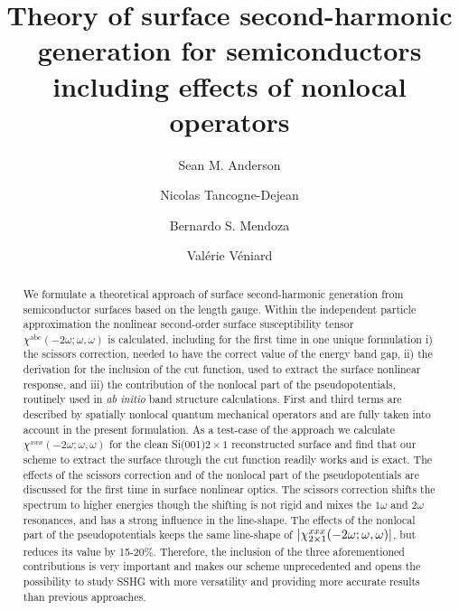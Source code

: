 \documentclass[floatfix,prb,aps,superscriptaddress,11pt,preprint,letterpaper]{revtex4}
\begin{document}
\title{Theory of surface second-harmonic generation for semiconductors
including effects of nonlocal operators}
\author{Sean M. Anderson}
\author{Nicolas Tancogne-Dejean}
\author{Bernardo S. Mendoza}
\author{Val\'erie V\'eniard}

\begin{abstract}
We formulate a theoretical approach of surface second-harmonic generation 
from semiconductor surfaces based on the length gauge. 
Within the independent particle approximation 
the nonlinear second-order surface susceptibility tensor
$\chi^{\mathrm{a}\mathrm{b}\mathrm{c}}(-2\omega;\omega,\omega)$   
is calculated, including for the first time in one unique formulation
i) the scissors correction, needed to have the correct value of the
energy band gap,
ii) the derivation for the inclusion of the cut function, 
used to extract the surface nonlinear response,
and iii) the contribution of the nonlocal part of the 
pseudopotentials, routinely  used in \textit{ab initio} band structure calculations. 
First and third terms are described by spatially nonlocal quantum
mechanical operators and are fully taken into account in the present formulation. 
As a test-case of the approach we calculate 
$\chi^{xxx}(-2\omega;\omega,\omega)$ for the clean Si(001)$2\times 1$
reconstructed surface and find that our scheme to extract the surface
through the cut function
readily works and is exact. The effects of the scissors correction and
of the nonlocal part of the pseudopotentials are discussed for the
first time in surface nonlinear optics. 
The scissors correction shifts the spectrum to 
higher energies though the shifting is not rigid and mixes the 
$1\omega$ and $2\omega$ resonances, 
and has a strong influence in the line-shape. 
The 
effects of the nonlocal part of the pseudopotentials 
keeps the same line-shape of $|\chi^{xxx}_{2\times 1}(-2\omega;\omega,\omega)|$, but 
reduces its value
by 15-20\%.  
Therefore, the inclusion of the three aforementioned 
contributions is very important and 
makes our scheme unprecedented and opens the possibility to 
study SSHG with more versatility and providing more accurate results 
than previous approaches. 
\end{abstract}  
\end{document}
